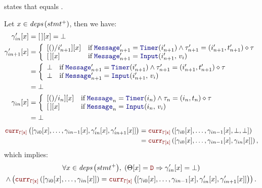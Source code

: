 \begin{skippableproof}
     states that 
    equals .

    Let $x \in {\ensuremath{\textit{deps}\left(stmt^+\right)}}$, then we have:
    \begin{align*}
        \gamma'_{in}[x]   & = \emptygamma[x] = \bot \\
        \gamma'_{in+1}[x] & =
        \left\{
        \begin{array}{ll}
            [()/i'_{n+1}][x] & \text{if} \; \mess'_{n+1} = \timerMess{i'_{n+1}} \wedge \tau'_{n+1} = (i'_{n+1}, t'_{n+1}) \diamond \tau \\
            \emptygamma[x]   & \text{if} \; \mess'_{n+1} = \inputMess{i'_{n+1}}{v_i}
        \end{array}
        \right.                                     \\
                          & =
        \left\{
        \begin{array}{ll}
            \bot & \text{if} \; \mess'_{n+1} = \timerMess{i'_{n+1}} \wedge \tau'_{n+1} = (i'_{n+1}, t'_{n+1}) \diamond \tau \\
            \bot & \text{if} \; \mess'_{n+1} = \inputMess{i'_{n+1}}{v_i}
        \end{array}
        \right.                                     \\
                          & = \bot                  \\
        \gamma_{in}[x]    & =
        \left\{
        \begin{array}{ll}
            [()/i_{n}][x]  & \text{if} \; \mess_{n} = \timerMess{i_{n}} \wedge \tau_{n} = (i_{n}, t_{n}) \diamond \tau \\
            \emptygamma[x] & \text{if} \; \mess_{n} = \inputMess{i_{n}}{v_i}
        \end{array}
        \right.                                     \\
                          & = \bot
    \end{align*}
    \begin{align*}
        \CurrVal{\tyCtx[x]}{[\gamma_{i0}[x], \dots, \gamma_{in-1}[x], \gamma'_{in}[x], \gamma'_{in+1}[x]]} & = \CurrVal{\tyCtx[x]}{[\gamma_{i0}[x], \dots, \gamma_{in-1}[x], \bot, \bot]}      \\
                                                                                                           & = \CurrVal{\tyCtx[x]}{[\gamma_{i0}[x], \dots, \gamma_{in-1}[x], \gamma_{in}[x]]},
    \end{align*}
    which implies:
    \begin{multline*}
        \forall x \in \depSet{stmt^+}, \; \left(\Theta[x] = \dType \Rightarrow \gamma'_{in}[x] = \bot\right) \\
        \wedge \left(\CurrVal{\tyCtx[x]}{[\gamma_{i0}[x], \dots, \gamma_{in}[x]]} = \CurrVal{\tyCtx[x]}{[\gamma_{i0}[x], \dots, \gamma_{in-1}[x], \gamma'_{in}[x], \gamma'_{in+1}[x]]}\right).
    \end{multline*}


\end{skippableproof}
